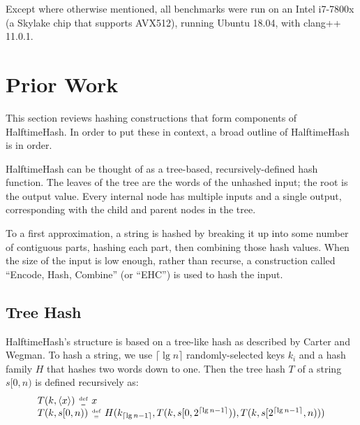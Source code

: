 \documentclass{llncs}
\newcommand{\nats}{\mathbb{N}}
\newcommand{\defeq}{\;\genfrac{}{}{0pt}{2}{\text{def}}{=}\;}
\begin{document}
Except where otherwise mentioned, all benchmarks were run on an Intel i7-7800x (a Skylake chip that supports AVX512), running Ubuntu 18.04, with clang++ 11.0.1.

\section{Prior Work}
\label{prior-work}


This section reviews hashing constructions that form components of HalftimeHash.
In order to put these in context, a broad outline of HalftimeHash is in order.

HalftimeHash can be thought of as a tree-based, recursively-defined hash function.
The leaves of the tree are the words of the unhashed input; the root is the output value.
Every internal node has multiple inputs and a single output, corresponding with the child and parent nodes in the tree.

To a first approximation, a string is hashed by breaking it up into some number of contiguous parts, hashing each part, then combining those hash values.
When the size of the input is low enough, rather than recurse, a construction called ``Encode, Hash, Combine'' (or ``EHC'') is used to hash the input.


\subsection{Tree Hash}

HalftimeHash's structure is based on a tree-like hash as described by Carter and Wegman. \cite[Section 3]{carter-wegman-79}
To hash a string, we use $\lceil \lg n \rceil$ randomly-selected keys $k_i$ and a hash family $H$ that hashes two words down to one.
Then the tree hash $T$ of a string $s[0,n)$ is defined recursively as:
\begin{equation}
\label{algebraic-badger}
\begin{array}{l}
T(k, \langle x \rangle) \defeq x \\
T(k, s[0,n)) \defeq H
(k_{  \lceil \lg n - 1 \rceil},
T(k, s[0, 2^{\lceil \lg n - 1 \rceil}) ),
T(k, s[ 2^{\lceil \lg n - 1 \rceil}, n) ))
\end{array}
\end{equation}
\end{document}

